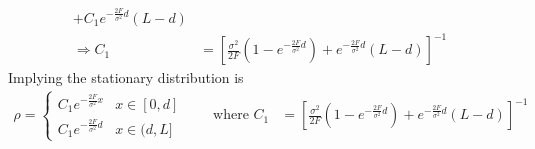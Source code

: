 \documentclass[12pt]{article}
\theoremstyle{plain}
\theoremstyle{definition}
\theoremstyle{remark}
\begin{document}
\begin{enumerate}
\begin{enumerate}
\begin{align*}
          + C_1e^{-\frac{2F}{\sigma^2}d}(L-d)\\
          \Rightarrow
          C_1
          &= \left[\frac{\sigma^2}{2F}\left(1-e^{-\frac{2F}{\sigma^2} d}\right)
          + e^{-\frac{2F}{\sigma^2}d}(L-d)\right]^{-1}
        \end{align*}
        Implying the stationary distribution is
        \begin{align*}
          \rho =
          \begin{cases}
            C_1e^{-\frac{2F }{\sigma^2} x} & x\in[0,d] \\
            C_1e^{-\frac{2F}{\sigma^2}d} & x\in(d,L]
          \end{cases}
          \qquad
          \text{where }
          C_1
          &= \left[\frac{\sigma^2}{2F}\left(1-e^{-\frac{2F}{\sigma^2} d}\right)
          + e^{-\frac{2F}{\sigma^2}d}(L-d)\right]^{-1}
        \end{align*}
    \end{enumerate}


\end{enumerate}
\end{document}
